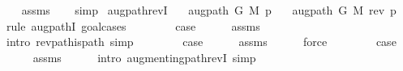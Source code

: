 \begin{isabellebody}
\endisataginvisible
{\isafoldinvisible}%
%
\isadeliminvisible
\isanewline
%
\endisadeliminvisible
%
\isadelimproof
\ \ %
\endisadelimproof
%
\isatagproof
{}\isamarkupfalse%
\ assms\isanewline
\ \ \isamarkupfalse%
\ simp%
\endisatagproof
{\isafoldproof}%
%
\isadelimproof
\isanewline
%
\endisadelimproof
\isanewline
{}\isamarkupfalse%
\ augpath{\isacharunderscore}{\kern0pt}revI{\isacharcolon}{\kern0pt}\isanewline
\ \ \ {\isachardoublequoteopen}augpath\ G\ M\ p{\isachardoublequoteclose}\isanewline
\ \ \ {\isachardoublequoteopen}augpath\ G\ M\ {\isacharparenleft}{\kern0pt}rev\ p{\isacharparenright}{\kern0pt}{\isachardoublequoteclose}\isanewline
%
\isadelimproof
%
\endisadelimproof
%
\isatagproof
{}\isamarkupfalse%
\ {\isacharparenleft}{\kern0pt}rule\ augpathI{\isacharcomma}{\kern0pt}\ goal{\isacharunderscore}{\kern0pt}cases{\isacharparenright}{\kern0pt}\isanewline
\ \ \isamarkupfalse%
\ {}\isanewline
\ \ \isamarkupfalse%
\ {\isacharquery}{\kern0pt}case\isanewline
\ \ \ \ \isamarkupfalse%
\ assms\isanewline
\ \ \ \ \isamarkupfalse%
\ {\isacharparenleft}{\kern0pt}intro\ rev{\isacharunderscore}{\kern0pt}path{\isacharunderscore}{\kern0pt}is{\isacharunderscore}{\kern0pt}path{\isacharparenright}{\kern0pt}\ simp\isanewline
{}\isamarkupfalse%
\isanewline
\ \ \isamarkupfalse%
\ {}\isanewline
\ \ \isamarkupfalse%
\ {\isacharquery}{\kern0pt}case\isanewline
\ \ \ \ \isamarkupfalse%
\ assms\isanewline
\ \ \ \ \isamarkupfalse%
\ force\isanewline
{}\isamarkupfalse%
\isanewline
\ \ \isamarkupfalse%
\ {}\isanewline
\ \ \isamarkupfalse%
\ {\isacharquery}{\kern0pt}case\isanewline
\ \ \ \ \isamarkupfalse%
\ assms\isanewline
\ \ \ \ \isamarkupfalse%
\ {\isacharparenleft}{\kern0pt}intro\ augmenting{\isacharunderscore}{\kern0pt}path{\isacharunderscore}{\kern0pt}revI{\isacharparenright}{\kern0pt}\ simp\isanewline
{}\isamarkupfalse%
%
\endisatagproof
{\isafoldproof}%
%
\isadelimproof
\isanewline
%
\endisadelimproof
%
\isadelimtheory
\isanewline
%
\endisadelimtheory
%
\isatagtheory
{}\isamarkupfalse%
%
\endisatagtheory
{\isafoldtheory}%
%
\isadelimtheory
%
\endisadelimtheory
%
\end{isabellebody}%
\endinput
